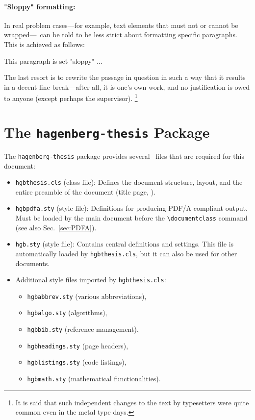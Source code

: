\paragraph{"Sloppy" formatting:} In real problem cases---for example, text
elements that must not or cannot be wrapped---\latex\ can be told to be less
strict about formatting specific paragraphs. This is achieved as follows:
%
\begin{LaTeXCode}[numbers=none]
\begin{sloppypar}
    This paragraph is set "sloppy" ...
\end{sloppypar}
\end{LaTeXCode}
%
The last resort is to rewrite the passage in question in such a way that it
results in a decent line break---after all, it is one's own work, and no
justification is owed to anyone (except perhaps the supervisor).%
\footnote{It is said that such independent changes to the text by typesetters were
quite common even in the metal type days.}



\section{The \texttt{hagenberg-thesis} Package}

The \texttt{hagenberg-thesis} package provides several \latex\ files that are
required for this document:
%
\begin{itemize}
  \item \nolinkurl{hgbthesis.cls} (class file): Defines the document
    structure, layout, and the entire preamble of the document (title page,
    \etc).
  \item \nolinkurl{hgbpdfa.sty} (style file): Definitions for producing
    PDF/A-compliant output. Must be loaded by the main document before
    the \verb!\documentclass! command (see also Sec.\ \ref{sec:PDFA}).
  \item \nolinkurl{hgb.sty} (style file): Contains central definitions and
    settings. This file is automatically loaded by \nolinkurl{hgbthesis.cls},
    but it can also be used for other documents.
  \item Additional style files imported by \nolinkurl{hgbthesis.cls}:
    \begin{itemize}
        \item[] \nolinkurl{hgbabbrev.sty} (various abbreviations),
        \item[] \nolinkurl{hgbalgo.sty} (algorithms),
        \item[] \nolinkurl{hgbbib.sty} (reference management),
        \item[] \nolinkurl{hgbheadings.sty} (page headers),
        \item[] \nolinkurl{hgblistings.sty} (code listings),
        \item[] \nolinkurl{hgbmath.sty} (mathematical functionalities).
    \end{itemize}
\end{itemize}


